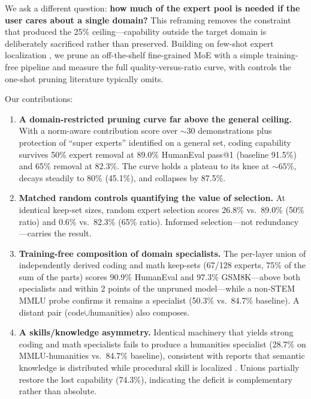 \documentclass[11pt]{article}
\begin{document}
We ask a different question: \textbf{how much of the expert pool is needed if
the user cares about a single domain?} This reframing removes the constraint
that produced the 25\% ceiling---capability outside the target domain is
deliberately sacrificed rather than preserved. Building on few-shot expert
localization \cite{easyep}, we prune an off-the-shelf fine-grained MoE with a
simple training-free pipeline and measure the full quality-versus-ratio curve,
with controls the one-shot pruning literature typically omits.

Our contributions:

\begin{enumerate}
\item \textbf{A domain-restricted pruning curve far above the general
ceiling.} With a norm-aware contribution score over ${\sim}30$ demonstrations
plus protection of ``super experts'' identified on a general set, coding
capability survives 50\% expert removal at 89.0\% HumanEval pass@1 (baseline
91.5\%) and 65\% removal at 82.3\%. The curve holds a plateau to its knee at
${\sim}65\%$, decays steadily to 80\% (45.1\%), and collapses by 87.5\%.

\item \textbf{Matched random controls quantifying the value of selection.} At
identical keep-set sizes, random expert selection scores 26.8\% vs.\ 89.0\%
(50\% ratio) and 0.6\% vs.\ 82.3\% (65\% ratio). Informed selection---not
redundancy---carries the result.

\item \textbf{Training-free composition of domain specialists.} The per-layer
union of independently derived coding and math keep-sets (67/128 experts, 75\%
of the sum of the parts) scores 90.9\% HumanEval and 97.3\% GSM8K---above both
specialists and within 2 points of the unpruned model---while a non-STEM MMLU
probe confirms it remains a specialist (50.3\% vs.\ 84.7\% baseline). A distant
pair (code$\cup$humanities) also composes.

\item \textbf{A skills/knowledge asymmetry.} Identical machinery that yields
strong coding and math specialists fails to produce a humanities specialist
(28.7\% on MMLU-humanities vs.\ 84.7\% baseline), consistent with reports that
semantic knowledge is distributed while procedural skill is localized
\cite{whatgets,illusion}. Unions partially restore the lost capability
(74.3\%), indicating the deficit is complementary rather than absolute.
\end{enumerate}
\end{document}
